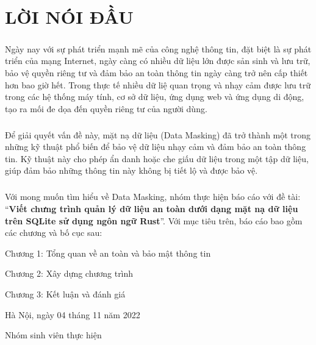
\chapter*{LỜI NÓI ĐẦU}
{}

\paragraph{}
Ngày nay với sự phát triển mạnh mẽ của công nghệ thông tin, đặt biệt là sự phát triển của mạng Internet, ngày càng có nhiều dữ liệu lớn được sản sinh và lưu trữ, bảo vệ quyền riêng tư và đảm bảo an toàn thông tin ngày càng trở nên cấp thiết hơn bao giờ hết. Trong thực tế nhiều dữ liệ quan trọng và nhạy cảm được lưu trữ trong các hệ thống máy tính, cơ sở dữ liệu, ứng dụng web và ứng dụng di động, tạo ra mối đe dọa đến quyền riêng tư của người dùng.

\paragraph{}
Để giải quyết vấn đề này, mặt nạ dữ liệu (Data Masking) đã trở thành một trong những kỹ thuật phổ biến để bảo vệ dữ liệu nhạy cảm và đảm bảo an toàn thông tin. Kỹ thuật này cho phép ẩn danh hoặc che giấu dữ liệu  trong một tập dữ liệu, giúp đảm bảo những thông tin này không bị tiết lộ và được bảo vệ. 

\paragraph{}
Với mong muốn tìm hiểu về Data Masking, nhóm thực hiện báo cáo với đề tài: “\textbf{Viết chưng trình quản lý dữ liệu an toàn dưới dạng mặt nạ dữ liệu trên SQLite sử dụng ngôn ngữ Rust}”. Với mục tiêu trên, báo cáo bao gồm các chương và bố cục sau:

\hspace{1cm}Chương 1: Tổng quan về an toàn và bảo mật thông tin

\hspace{1cm}Chương 2: Xây dựng chương trình

\hspace{1cm}Chương 3: Kết luận và đánh giá

\vspace{0.5cm}

\hspace{6cm}Hà Nội, ngày 04 tháng 11 năm 2022

\vspace{2cm}

\hspace{7cm}Nhóm sinh viên thực hiện

